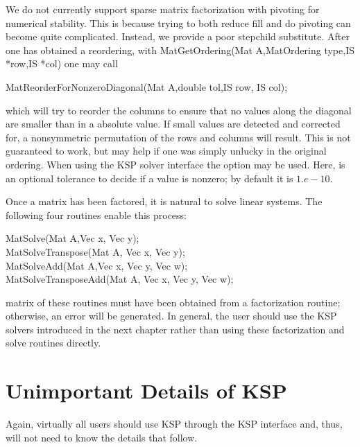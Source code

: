 {{We do not currently support sparse matrix factorization with pivoting
for numerical stability. This is because trying to both reduce fill
and do pivoting can become quite complicated. Instead, we provide a
poor stepchild substitute. After one has obtained a reordering, with
MatGetOrdering(Mat A,MatOrdering type,IS *row,IS *col) one
may call
\begin{tabbing}
  MatReorderForNonzeroDiagonal(Mat A,double tol,IS row, IS col);
\end{tabbing}
which will try to reorder the columns to ensure that no values along
the diagonal are smaller than  in a absolute value. If small
values are detected and corrected for, a nonsymmetric
permutation of the rows and columns will result. This is not guaranteed to work,
but may help if one was simply unlucky in the original ordering.
When using the KSP solver interface
the option  
may be used.  Here, 
is an optional tolerance to decide if a value is nonzero; by default it
is $ 1.e-10.$

Once a matrix has been factored, it is natural to solve linear systems.
The following four routines enable this process: 
\begin{tabbing}
  MatSolve(Mat A,Vec x, Vec y);\\
  MatSolveTranspose(Mat A, Vec x, Vec y);\\
  MatSolveAdd(Mat A,Vec x, Vec y, Vec w);\\
  MatSolveTransposeAdd(Mat A, Vec x, Vec y, Vec w);
\end{tabbing}
matrix
 of these routines must have been obtained from a
factorization routine; otherwise, an error will be generated.
In general, the user should use the KSP solvers introduced in the
next chapter rather than using these factorization and solve routines
directly.

\section{Unimportant Details of KSP}

Again, virtually all users should use KSP through the KSP interface
and, thus, will not need to know the details that follow.

}}
